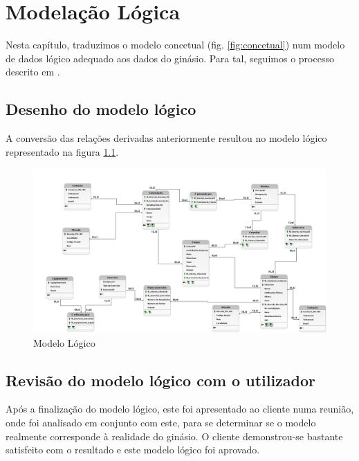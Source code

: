 \chapter{Modelação Lógica}


Nesta capítulo, traduzimos o modelo concetual (fig. \ref{fig:concetual}) num modelo de dados lógico adequado aos dados do ginásio. Para tal, seguimos o processo descrito em \cite{dbsys}.



\section{Desenho do modelo lógico}

A conversão das relações derivadas anteriormente resultou no modelo lógico representado na figura \ref{fig:mod_logico}.

\begin{figure}[h]
\begin{center}
\includegraphics[width=\textwidth]{modelacao_logica/logicoBR.png}
\caption{Modelo Lógico}
\label{fig:mod_logico}
\end{center}
\end{figure}








\section{Revisão do modelo lógico com o utilizador}

Após a finalização do modelo lógico, este foi apresentado ao cliente numa reunião, onde foi analisado em conjunto com este, para se determinar se o modelo realmente corresponde à realidade do ginásio. O cliente demonstrou-se bastante satisfeito com o resultado e este modelo lógico foi aprovado.